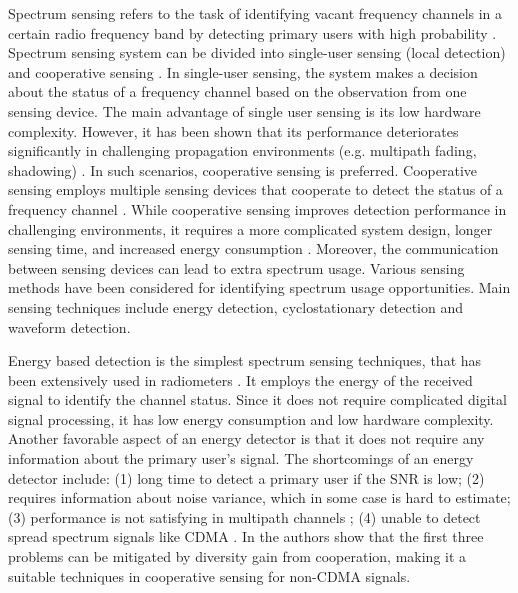 Spectrum sensing refers to the task of identifying vacant frequency channels in a certain radio frequency band by detecting primary users with high probability \cite{umar2012spectrum}. 
Spectrum sensing system can be divided into single-user sensing (local detection) and cooperative sensing \cite{wang2011advances, akyildiz2011cooperative, ma2008soft, axell2010overview}. In single-user sensing, the system makes a decision about the status of a frequency channel based on the observation from one sensing device. The main advantage of single user sensing is its low hardware complexity. However, it has been shown that its performance deteriorates significantly in challenging propagation environments (e.g. multipath fading, shadowing) \cite{akyildiz2011cooperative}. In such scenarios, cooperative sensing is preferred. Cooperative sensing employs  multiple sensing devices that cooperate to detect the status of a frequency channel \cite{ganesan2005cooperative, arslan2007cognitive}. While cooperative sensing improves detection performance in challenging environments, it requires a more complicated system design,  longer sensing time,  and increased energy consumption \cite{akyildiz2011cooperative}.  
Moreover, the communication between sensing devices can lead to extra spectrum usage. 
Various sensing methods have been considered for identifying spectrum usage opportunities. Main sensing techniques include  energy detection, cyclostationary detection and waveform detection. 

Energy based detection is the simplest spectrum sensing techniques, that has been extensively used in radiometers \cite{cabric2004implementation, poor1994introduction, urkowitz1967energy}. It employs the energy of the received signal to identify the channel status. Since it does not require complicated digital signal processing, it has low energy consumption and low hardware complexity.  Another favorable aspect of an energy detector is that it does not require  any information about the primary user's signal.  
The shortcomings of an energy detector include: (1) long time to detect a  primary user if the SNR is low; (2) requires information about noise variance, which in some case is hard to estimate; (3) performance is not satisfying in multipath channels \cite{akyildiz2011cooperative}; (4) unable to detect spread spectrum signals like CDMA \cite{urkowitz1967energy, akyildiz2011cooperative}. 
In \cite{akyildiz2011cooperative} the authors show that the first three problems can be mitigated by diversity gain from cooperation,  making it a suitable techniques in cooperative sensing for non-CDMA signals.  

